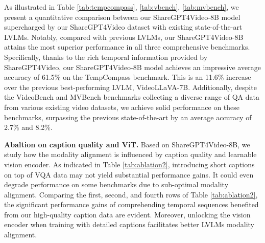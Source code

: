 As illustrated in Table \ref{tab:tempcompass}, \ref{tab:vbench}, \ref{tab:mvbench}, we present a quantitative comparison between our ShareGPT4Video-8B model supercharged by our ShareGPT4Video dataset with existing state-of-the-art LVLMs. Notably, compared with previous LVLMs, our ShareGPT4Video-8B attains the most superior performance in all three comprehensive benchmarks.  
Specifically, thanks to the rich temporal information provided by ShareGPT4Video, our ShareGPT4Video-8B model achieves an impressive average accuracy of 61.5\% on the TempCompass benchmark. This is an 11.6\% increase over the previous best-performing LVLM, VideoLLaVA-7B. 
Additionally, despite the VideoBench and MVBench benchmarks collecting a diverse range of QA data from various existing video datasets, we achieve solid performance on these benchmarks, surpassing the previous state-of-the-art by an average accuracy of 2.7\% and 8.2\%. 

\textbf{Abaltion on caption quality and ViT.}
Based on ShareGPT4Video-8B, we study how the modality alignment is influenced by caption quality and learnable vision encoder. As indicated in Table \ref{tab:ablation2}, introducing short captions on top of VQA data may not yield substantial performance gains. It could even degrade performance on some benchmarks due to sub-optimal modality alignment. Comparing the first, second, and fourth rows of Table \ref{tab:ablation2}, the significant performance gains of comprehending temporal sequences benefited from our high-quality caption data are evident. Moreover, unlocking the vision encoder when training with detailed captions facilitates better LVLMs modality alignment.

